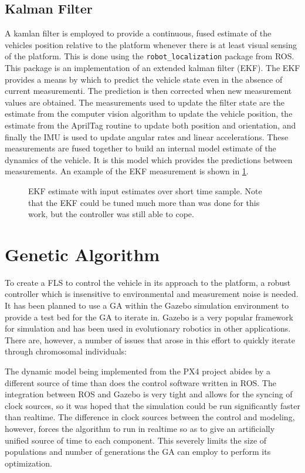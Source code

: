 \subsection{Kalman Filter}
A kamlan filter is employed to provide a continuous, fused estimate of the vehicles position relative to the
platform whenever there is at least visual sensing of the platform. This is done using the
\verb|robot_localization| package from ROS\cite{MooreStouchKeneralizedEkf2014}. This package is an
implementation of an extended kalman filter (EKF). The EKF provides a means by which to predict the vehicle
state even in the absence of current measurementi\cite{kalman1960new}. The prediction is then corrected when
new measurement values are obtained. The measurements used to update the filter state are the estimate from
the computer vision algorithm to update the vehicle position, the estimate from the
AprilTag\cite{olson2011tags} routine to update both position and orientation, and finally the IMU is used to
update angular rates and linear accelerations. These measurements are fused together to build an internal
model estimate of the dynamics of the vehicle. It is this model which provides the predictions between
measurements. An example of the EKF measurement is shown in \cref{f:ekf_plot}.

\begin{figure}[ht]
    \centering
    
    \caption{EKF estimate with input estimates over short time sample. Note that the EKF could be tuned much
    more than was done for this work, but the controller was still able to cope.}\label{f:ekf_plot}
\end{figure}

\section{Genetic Algorithm}
To create a FLS to control the vehicle in its approach to the platform, a robust controller which is
insensitive to environmental and measurement noise is needed. It has been planned to use a GA within the
Gazebo simulation environment to provide a test bed for the GA to iterate in. Gazebo is a very popular
framework for simulation and has been used in evolutionary robotics in other
applications\cite{nogueira2014comparative}. There are, however, a number of issues that arose in this effort
to quickly iterate through chromosomal individuals:

The dynamic model being implemented from the PX4 project\cite{martin2010true} abides by a different
source of time than does the control software written in ROS. The integration between ROS and Gazebo
is very tight and allows for the syncing of clock sources, so it was hoped that the simulation could
be run significantly faster than realtime. The difference in clock sources between the control and
modeling, however, forces the algorithm to run in realtime so as to give an artificially unified
source of time to each component. This severely limits the size of populations and number of
generations the GA can employ to perform its optimization.

